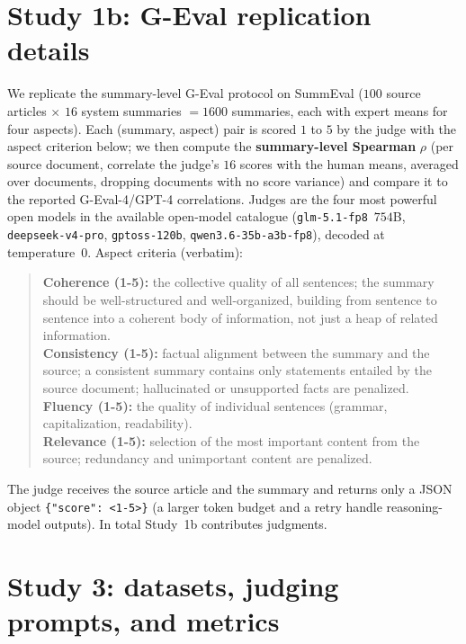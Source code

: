 \section{Study 1b: G-Eval replication details}\label{app:s1bdetail}
We replicate the summary-level G-Eval protocol \citep{liu2023geval} on SummEval \citep{fabbri2021summeval}
($100$ source articles $\times$ $16$ system summaries $=1600$ summaries, each with expert means for four aspects).
Each (summary, aspect) pair is scored $1$ to $5$ by the judge with the aspect criterion below; we then compute the
\textbf{summary-level Spearman} $\rho$ (per source document, correlate the judge's $16$ scores with the human means,
averaged over documents, dropping documents with no score variance) and compare it to the reported G-Eval-4/GPT-4
correlations. Judges are the four most powerful open models in the available open-model catalogue
(\texttt{glm-5.1-fp8}~$754$B, \texttt{deepseek-v4-pro}, \texttt{gptoss-120b}, \texttt{qwen3.6-35b-a3b-fp8}), decoded
at temperature~$0$. Aspect criteria (verbatim):
\begin{quote}\small
\textbf{Coherence (1-5):} the collective quality of all sentences; the summary should be well-structured and
well-organized, building from sentence to sentence into a coherent body of information, not just a heap of related
information.\\[2pt]
\textbf{Consistency (1-5):} factual alignment between the summary and the source; a consistent summary contains only
statements entailed by the source document; hallucinated or unsupported facts are penalized.\\[2pt]
\textbf{Fluency (1-5):} the quality of individual sentences (grammar, capitalization, readability).\\[2pt]
\textbf{Relevance (1-5):} selection of the most important content from the source; redundancy and unimportant
content are penalized.
\end{quote}
The judge receives the source article and the summary and returns only a JSON object \verb|{"score": <1-5>}| (a
larger token budget and a retry handle reasoning-model outputs). In total Study~1b contributes \ONEnjudg{} judgments.

\section{Study 3: datasets, judging prompts, and metrics}\label{app:s3detail}
